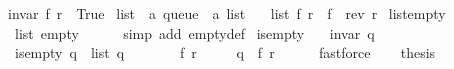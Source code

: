 \begin{isabellebody}
\ \ {\isachardoublequoteopen}invar\ {\isacharparenleft}{\kern0pt}f{\isacharcomma}{\kern0pt}\ r{\isacharparenright}{\kern0pt}\ {\isacharequal}{\kern0pt}\ True{\isachardoublequoteclose}\isanewline
\isanewline
{}\isamarkupfalse%
\ list\ {\isacharcolon}{\kern0pt}{\isacharcolon}{\kern0pt}\ {\isachardoublequoteopen}{\isacharprime}{\kern0pt}a\ queue\ {\isasymRightarrow}\ {\isacharprime}{\kern0pt}a\ list{\isachardoublequoteclose}\ \isanewline
\ \ {\isachardoublequoteopen}list\ {\isacharparenleft}{\kern0pt}f{\isacharcomma}{\kern0pt}\ r{\isacharparenright}{\kern0pt}\ {\isacharequal}{\kern0pt}\ f\ {\isacharat}{\kern0pt}\ {\isacharparenleft}{\kern0pt}rev\ r{\isacharparenright}{\kern0pt}{\isachardoublequoteclose}%
\isadelimdocument
%
\endisadelimdocument
%
\isatagdocument
%
\isamarkuptrue%
%
\endisatagdocument
{\isafolddocument}%
%
\isadelimdocument
%
\endisadelimdocument
{}\isamarkupfalse%
\ list{\isacharunderscore}{\kern0pt}empty{\isacharcolon}{\kern0pt}\isanewline
\ \ \ {\isachardoublequoteopen}list\ empty\ {\isacharequal}{\kern0pt}\ {\isacharbrackleft}{\kern0pt}{\isacharbrackright}{\kern0pt}{\isachardoublequoteclose}\isanewline
%
\isadelimproof
\ \ %
\endisadelimproof
%
\isatagproof
{}\isamarkupfalse%
\ {\isacharparenleft}{\kern0pt}simp\ add{\isacharcolon}{\kern0pt}\ empty{\isacharunderscore}{\kern0pt}def{\isacharparenright}{\kern0pt}%
\endisatagproof
{\isafoldproof}%
%
\isadelimproof
\isanewline
%
\endisadelimproof
\isanewline
{}\isamarkupfalse%
\ is{\isacharunderscore}{\kern0pt}empty{\isacharcolon}{\kern0pt}\isanewline
\ \ \ {\isachardoublequoteopen}invar\ q{\isachardoublequoteclose}\isanewline
\ \ \ {\isachardoublequoteopen}is{\isacharunderscore}{\kern0pt}empty\ q\ {\isasymlongleftrightarrow}\ list\ q\ {\isacharequal}{\kern0pt}\ {\isacharbrackleft}{\kern0pt}{\isacharbrackright}{\kern0pt}{\isachardoublequoteclose}\isanewline
%
\isadelimproof
%
\endisadelimproof
%
\isatagproof
{}\isamarkupfalse%
\ {\isacharminus}{\kern0pt}\isanewline
\ \ \isamarkupfalse%
\ f\ r\ \isanewline
\ \ \ \ {\isachardoublequoteopen}q\ {\isacharequal}{\kern0pt}\ {\isacharparenleft}{\kern0pt}f{\isacharcomma}{\kern0pt}\ r{\isacharparenright}{\kern0pt}{\isachardoublequoteclose}\isanewline
\ \ \ \ \isamarkupfalse%
\ fastforce\isanewline
\ \ \isamarkupfalse%
\ {\isacharquery}{\kern0pt}thesis\isanewline
\ \ \ \ \isamarkupfalse%

\end{isabellebody}
